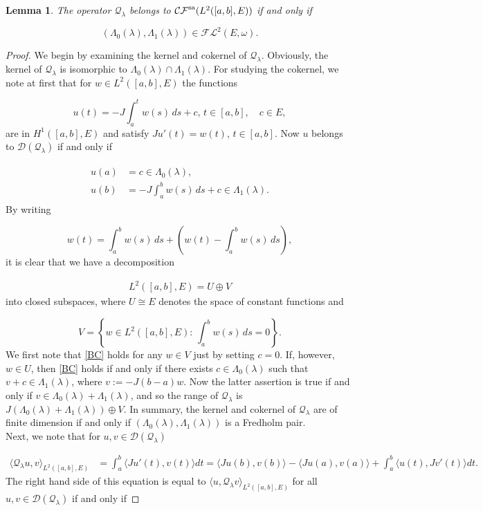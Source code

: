 \documentclass[a4paper,10pt]{article}
\newtheorem{lemma}[theorem]{Lemma}
\begin{document}
\begin{lemma}\label{lemma-selfFredIFF}
The operator $\mathcal{Q}_\lambda$ belongs to $\mathcal{CF}^\textup{sa}(L^2([a,b],E))$ if and only if 

\[(\Lambda_0(\lambda),\Lambda_1(\lambda))\in\mathcal{FL}^2(E,\omega).\]
\end{lemma}

\begin{proof}
We begin by examining the kernel and cokernel of $\mathcal{Q}_\lambda$. Obviously, the kernel of $\mathcal{Q}_\lambda$ is isomorphic to $\Lambda_0(\lambda)\cap\Lambda_1(\lambda)$. For studying the cokernel, we note at first that for $w\in L^2([a,b],E)$ the functions

\[u(t)=-J\int^t_a{w(s)\,ds}+c,\, t\in [a,b],\quad c\in E,\]
are in $H^1([a,b],E)$ and satisfy $Ju'(t)=w(t)$, $t\in [a,b]$. Now $u$ belongs to $\mathcal{D}(\mathcal{Q}_\lambda)$ if and only if

\begin{align}\label{BC}
\begin{split}
u(a)&=c\in\Lambda_0(\lambda),\\
u(b)&=-J\int^b_a{w(s)\,ds}+c\in\Lambda_1(\lambda).
\end{split}
\end{align} 
By writing 

\[w(t)=\int^b_a{w(s)\,ds}+(w(t)-\int^b_a{w(s)\,ds}),\]
it is clear that we have a decomposition

\begin{align*}
L^2([a,b],E)=U\oplus V
\end{align*}
into closed subspaces, where $U\cong E$ denotes the space of constant functions and 

\[V=\left\{w\in L^2([a,b],E):\,\int^b_a{w(s)\,ds}=0\right\}.\]
We first note that \eqref{BC} holds for any $w\in V$ just by setting $c=0$. If, however, $w\in U$, then \eqref{BC} holds if and only if there exists $c\in\Lambda_0(\lambda)$ such that $v+c\in\Lambda_1(\lambda)$, where $v:=-J(b-a)w$. Now the latter assertion is true if and only if $v\in\Lambda_0(\lambda)+\Lambda_1(\lambda)$, and so the range of $\mathcal{Q}_\lambda$ is $J(\Lambda_0(\lambda)+\Lambda_1(\lambda))\oplus V$. In summary, the kernel and cokernel of $\mathcal{Q}_\lambda$ are of finite dimension if and only if $(\Lambda_0(\lambda),\Lambda_1(\lambda))$ is a Fredholm pair.\\ 
Next, we note that for $u,v\in\mathcal{D}(\mathcal{Q}_\lambda)$

\begin{align*}
\langle\mathcal{Q}_\lambda u,v\rangle_{L^2([a,b],E)}&=\int^b_a{\langle Ju'(t),v(t)\rangle dt}=\langle Ju(b),v(b)\rangle-\langle Ju(a),v(a)\rangle+\int^b_a\langle u(t),Jv'(t)\rangle dt.
\end{align*}
The right hand side of this equation is equal to $\langle u,\mathcal{Q}_\lambda v\rangle_{L^2([a,b],E)}$ for all $u,v\in\mathcal{D}(\mathcal{Q}_\lambda)$ if and only if


\end{proof}
\end{document}
